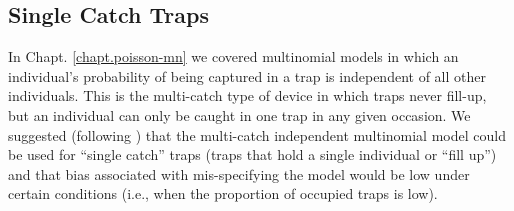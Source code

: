 \subsection{Single Catch Traps}

In Chapt. \ref{chapt.poisson-mn} we covered multinomial models in
which an individual's probability of being captured in a trap is
independent of all other individuals.  This is the multi-catch type of
device in which traps never fill-up, but an individual can only be
caught in one trap in any given occasion. We suggested (following
\citet{efford_etal:2009euring}) that the multi-catch independent
multinomial model could be used for ``single catch'' traps (traps that
hold a single individual or ``fill up'') and that bias associated with
mis-specifying the model would be low under certain conditions (i.e.,
when the proportion of occupied traps is low).

